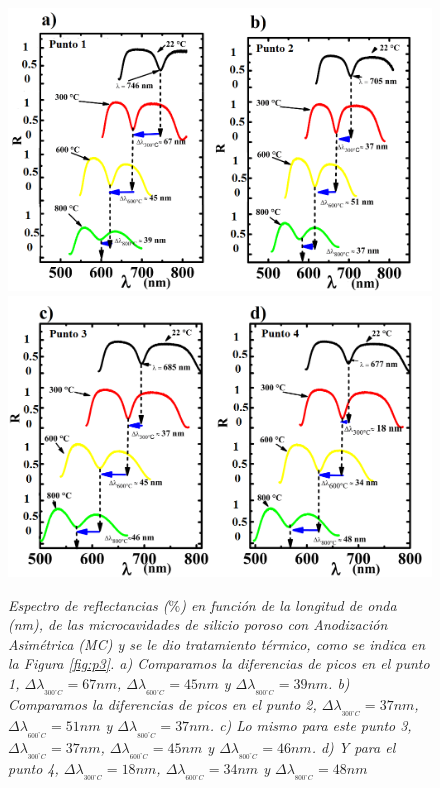 \documentclass[a4paper,11pt,]{book}
\begin{document}
\begin{figure}[H]
	\centering
	\includegraphics[scale=.35]{../Images/p2}
	\includegraphics[scale=.35]{../Images/p3}
	\caption{\emph{Espectro de reflectancias ($\%$) en función de la longitud de onda (nm), de las microcavidades de silicio poroso con Anodización Asimétrica (MC) y se le dio tratamiento térmico, como se indica en la Figura \ref{fig:p3}. a) Comparamos la diferencias de picos en el punto 1, $\Delta \lambda_{_{300^{\circ} C}}=67 nm$,  $\Delta \lambda_{_{600^{\circ} C}}=45 nm$ y  $\Delta \lambda_{_{800^{\circ} C}}=39 nm$. b) Comparamos la diferencias de picos en el punto 2, $\Delta \lambda_{_{300^{\circ} C}}=37 nm$,  $\Delta \lambda_{_{600^{\circ} C}}=51 nm$ y  $\Delta \lambda_{_{800^{\circ} C}}=37 nm$. c) Lo mismo para este punto 3, $\Delta \lambda_{_{300^{\circ} C}}=37 nm$,  $\Delta \lambda_{_{600^{\circ} C}}=45 nm$ y  $\Delta \lambda_{_{800^{\circ} C}}=46 nm$. d) Y para el punto 4,  $\Delta \lambda_{_{300^{\circ} C}}=18 nm$,  $\Delta \lambda_{_{600^{\circ} C}}=34 nm$ y  $\Delta \lambda_{_{800^{\circ} C}}=48 nm$ }}
	\label{fig:p4}
\end{figure}
\end{document}
